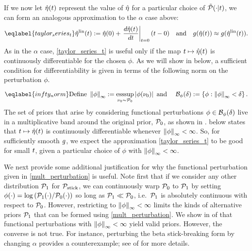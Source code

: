 If we now let $\hat\eta(t)$ represent the value of $\hat\eta$ for a particular
choice of $\tilde{\mathcal{P}}(\cdot \vert t)$, we can form an analogous approximation to the
$\alpha$ case above:
%
\begin{align} \eqlabel{taylor_series_t}
%
\etalin(\t) :=
    \etaopt(0) +
    \fracat{d\etaopt(t)}{dt}{\t=0} (\t - 0)
\mathand
g(\etaopt(\t)) \approx g(\etalin(\t)).
%
\end{align}
%
As in the $\alpha$ case, \eqref{taylor_series_t} is useful only if the map $t
\mapsto \hat\eta(t)$ is continuously differentiable for the chosen $\phi$.  As we
will show in  below, a sufficient condition for
differentiability is given in terms of the following norm on the perturbation
$\phi$.

\begin{equation} \eqlabel{infty_norm}
    \textrm{Define }
	\norminf{\phi} := \esssup_{\nu_0 \sim \pbase} \abs{\phi(\nu_0)}
    \textrm{ and }
	\quad \ball_\phi(\delta) := \left\{ \phi: \norminf{\phi} <
\delta \right\}.
\end{equation}
%
The set of priors that arise by considering functional perturbations $\phi \in
\mathcal{B}_\phi(\delta)$ live in a multiplicative band around the original prior,
$\mathcal{P}_{0}$, as shown in .   below states
that $t \mapsto \hat\eta(t)$ is continuously differentiable whenever
$\left\Vert\phi\right\Vert_{\infty} < \infty$.  So, for sufficiently smooth $g$, we expect the
approximation \eqref{taylor_series_t} to be good for small $t$, given a
particular choice of $\phi$ with $\left\Vert\phi\right\Vert_{\infty} < \infty$.

We next provide some additional justification for why the functional
perturbation given in \eqref{mult_perturbation} is useful. Note first that if we
consider any other distribution $\mathcal{P}_{1}$ for $\mathcal{P}_{\mathrm{stick}}$, we can continuously warp
$\mathcal{P}_{0}$ to $\mathcal{P}_{1}$ by setting $\phi(\cdot) = \log \left( \mathcal{P}_{1}(\cdot) /
\mathcal{P}_{0}(\cdot) \right)$ so long as $\mathcal{P}_{1} \ll \mathcal{P}_{0}$, i.e.\ $\mathcal{P}_{1}$ is
absolutely continuous with respect to $\mathcal{P}_{0}$.
%
However, restricting to $\left\Vert\phi\right\Vert_{\infty} < \infty$ limits the kinds of
alternative priors $\mathcal{P}_{1}$ that can be formed using \eqref{mult_perturbation}.
We show in  of  that
functional perturbations with $\left\Vert\phi\right\Vert_{\infty} < \infty$ yield valid priors.
However, the converse is not true. For instance, perturbing the beta
stick-breaking form by changing $\alpha$ provides a counterexample; see
 of  for more details.

